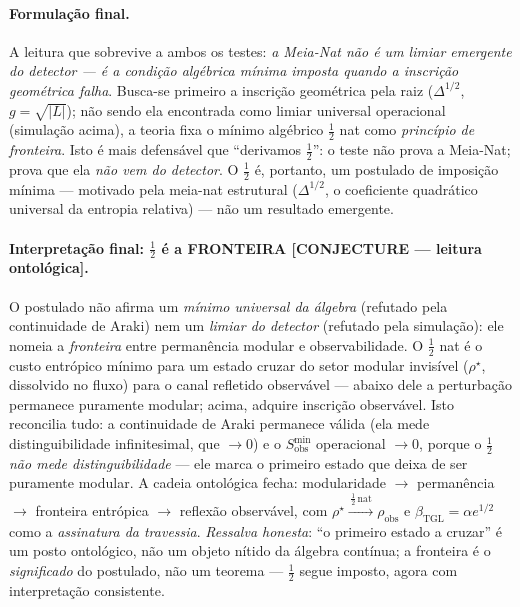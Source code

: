 \documentclass[12pt,a4paper]{article}
\newcommand{\betatgl}{\beta_{\text{TGL}}}
\newcommand{\rhostar}{\rho^{\star}}
\begin{document}
\paragraph{Formulação final.} A leitura que sobrevive a ambos os testes: \emph{a Meia-Nat não é um limiar emergente do detector --- é a condição algébrica mínima imposta quando a inscrição geométrica falha}.  Busca-se primeiro a inscrição geométrica pela raiz ($\Delta^{1/2}$, $g=\sqrt{|L|}$); não sendo ela encontrada como limiar universal operacional (simulação acima), a teoria fixa o mínimo algébrico $\tfrac12$ nat como \emph{princípio de fronteira}.  Isto é mais defensável que ``derivamos $\tfrac12$'': o teste não prova a Meia-Nat; prova que ela \emph{não vem do detector}.  O $\tfrac12$ é, portanto, um postulado de imposição mínima --- motivado pela meia-nat estrutural ($\Delta^{1/2}$, o coeficiente quadrático universal da entropia relativa) --- não um resultado emergente.

\paragraph{Interpretação final: $\tfrac12$ é a FRONTEIRA \textbf{[CONJECTURE --- leitura ontológica]}.} O postulado não afirma um \emph{mínimo universal da álgebra} (refutado pela continuidade de Araki) nem um \emph{limiar do detector} (refutado pela simulação): ele nomeia a \emph{fronteira} entre permanência modular e observabilidade.  O $\tfrac12$ nat é o custo entrópico mínimo para um estado cruzar do setor modular invisível ($\rhostar$, dissolvido no fluxo) para o canal refletido observável --- abaixo dele a perturbação permanece puramente modular; acima, adquire inscrição observável.  Isto reconcilia tudo: a continuidade de Araki permanece válida (ela mede distinguibilidade infinitesimal, que $\to 0$) e o $S_{\mathrm{obs}}^{\min}$ operacional $\to 0$, porque o $\tfrac12$ \emph{não mede distinguibilidade} --- ele marca o primeiro estado que deixa de ser puramente modular.  A cadeia ontológica fecha: modularidade $\to$ permanência $\to$ fronteira entrópica $\to$ reflexão observável, com $\rhostar\xrightarrow{\,\frac12\,\mathrm{nat}\,}\rho_{\mathrm{obs}}$ e $\betatgl=\alpha e^{1/2}$ como a \emph{assinatura da travessia}.  \emph{Ressalva honesta}: ``o primeiro estado a cruzar'' é um posto ontológico, não um objeto nítido da álgebra contínua; a fronteira é o \emph{significado} do postulado, não um teorema --- $\tfrac12$ segue imposto, agora com interpretação consistente.
\end{document}
